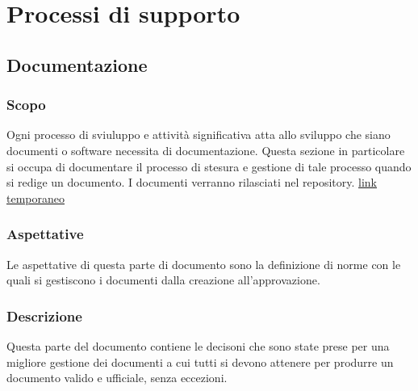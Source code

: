 \section{Processi di supporto}
\subsection{Documentazione}

\subsubsection{Scopo}
Ogni processo di sviuluppo e attivit\`a significativa atta allo sviluppo che
siano documenti o software necessita di documentazione.
Questa sezione in particolare si occupa di documentare il processo di stesura e
gestione di tale processo quando si redige un documento.
I documenti verranno rilasciati nel repository\glo.
\href{https://github.com/Jatus93/sweDocs}{link temporaneo}

\subsubsection{Aspettative}
Le aspettative di questa parte di documento sono la definizione di norme con le
quali si gestiscono i documenti dalla creazione all'approvazione.

\subsubsection{Descrizione}
Questa parte del documento contiene le decisoni che sono state prese per una
migliore gestione dei documenti a cui tutti si devono attenere per produrre un
documento valido e ufficiale, senza eccezioni.

